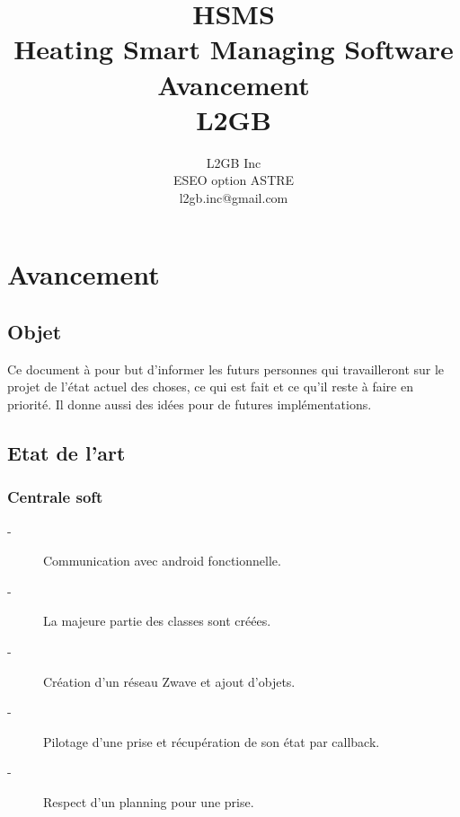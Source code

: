 \documentclass[11pt,a4paper]{report} %
\author{L2GB Inc\\
		ESEO option ASTRE\\
		l2gb.inc@gmail.com
		}
\title{HSMS\\Heating Smart Managing Software  \\Avancement\\L2GB}
\newcommand{\sommaire}{\shorttoc{Sommaire}{1}}
\renewcommand{\figurename}{Illustration} %
\begin{document}
\renewcommand{\figurename}{Illustration} 
\maketitle %
\sommaire %

\chapter{Avancement}
		\section{Objet}

Ce document à pour but d'informer les futurs personnes qui travailleront sur le projet de l'état actuel des choses, ce qui est fait et ce qu'il reste à faire en priorité. Il donne aussi des idées pour de futures implémentations.
\newpage

		\section{Etat de l'art}
		
			\subsection{Centrale soft}
			
\begin{description}
	\item[-] Communication avec android fonctionnelle.
	\item[-] La majeure partie des classes sont créées.
	\item[-] Création d'un réseau Zwave et ajout d'objets.
	\item[-] Pilotage d'une prise et récupération de son état par callback.
	\item[-] Respect d'un planning pour une prise.
\end{description}



			
			
\end{document}
